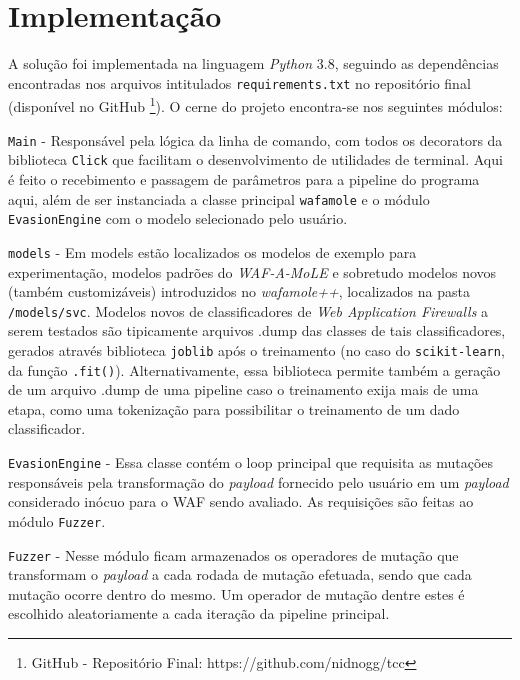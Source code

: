 \section{Implementação}

A solução foi implementada na linguagem \textit{Python} 3.8, seguindo as dependências encontradas nos arquivos intitulados \verb+requirements.txt+ no repositório final (disponível no GitHub \footnote{GitHub - Repositório Final: https://github.com/nidnogg/tcc}). O cerne do projeto encontra-se nos seguintes módulos:
\begin{alineas}
\item \verb+Main+ - Responsável pela lógica da linha de comando, com todos os decorators da biblioteca \verb+Click+ que facilitam o desenvolvimento de utilidades de terminal. Aqui é feito o recebimento e passagem de parâmetros para a pipeline do programa aqui, além de ser instanciada a classe principal \verb+wafamole+ e o módulo \verb+EvasionEngine+ com o modelo selecionado pelo usuário.
\item \verb+models+ - Em models estão localizados os modelos de exemplo para experimentação, modelos padrões do \textit{WAF-A-MoLE} e sobretudo modelos novos (também customizáveis) introduzidos no \textit{wafamole++}, localizados na pasta \verb+/models/svc+. Modelos novos de classificadores de \textit{Web Application Firewalls} a serem testados são tipicamente arquivos .dump das classes de tais classificadores, gerados através biblioteca \verb+joblib+ após o treinamento (no caso do \verb+scikit-learn+, da função \verb+.fit()+). Alternativamente, essa biblioteca permite também a geração de um arquivo .dump de uma pipeline caso o treinamento exija mais de uma etapa, como uma tokenização para possibilitar o treinamento de um dado classificador.
\item \verb+EvasionEngine+ - Essa classe contém o loop principal que requisita as mutações responsáveis pela transformação do \textit{payload} fornecido pelo usuário em um \textit{payload} considerado inócuo para o WAF sendo avaliado. As requisições são feitas ao módulo \verb+Fuzzer+.
\item \verb+Fuzzer+ - Nesse módulo ficam armazenados os operadores de mutação que transformam o \textit{payload} a cada rodada de mutação efetuada, sendo que cada mutação ocorre dentro do mesmo. Um operador de mutação dentre estes é escolhido aleatoriamente a cada iteração da pipeline principal.
\end{alineas}

